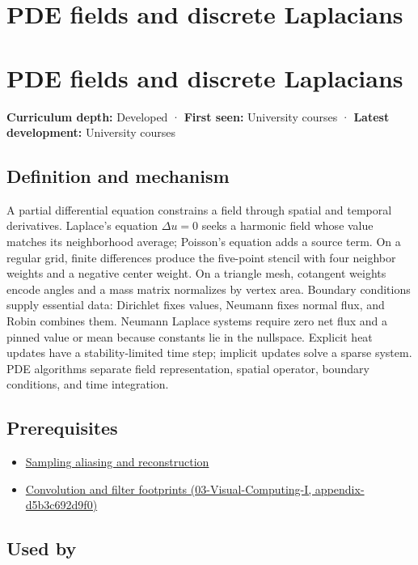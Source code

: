 \hypertarget{appendix-1988d465c119}{}
\section*{PDE fields and discrete Laplacians}
\section{PDE fields and discrete Laplacians}\label{pde-fields-and-discrete-laplacians}

\textbf{Curriculum depth:} Developed · \textbf{First seen:} University courses · \textbf{Latest development:} University courses

\subsection{Definition and mechanism}\label{definition-and-mechanism}

A partial differential equation constrains a field through spatial and temporal derivatives. Laplace's equation \(\Delta u=0\) seeks a harmonic field whose value matches its neighborhood average; Poisson's equation adds a source term. On a regular grid, finite differences produce the five-point stencil with four neighbor weights and a negative center weight. On a triangle mesh, cotangent weights encode angles and a mass matrix normalizes by vertex area. Boundary conditions supply essential data: Dirichlet fixes values, Neumann fixes normal flux, and Robin combines them. Neumann Laplace systems require zero net flux and a pinned value or mean because constants lie in the nullspace. Explicit heat updates have a stability-limited time step; implicit updates solve a sparse system. PDE algorithms separate field representation, spatial operator, boundary conditions, and time integration.

\subsection{Prerequisites}\label{prerequisites}

\begin{itemize}
\tightlist
\item
  \hyperref[appendix-6a7869dd79a6]{Sampling aliasing and reconstruction}
\item
  \href{}{Convolution and filter footprints (03-Visual-Computing-I, appendix-d5b3c692d9f0)}
\end{itemize}

\subsection{Used by}\label{used-by}

